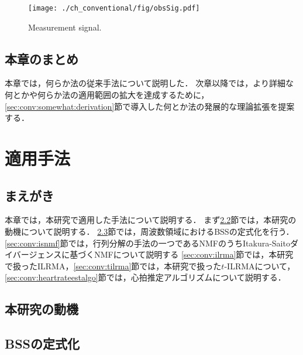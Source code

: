 \begin{figure}[tb]
\centering
\texttt{[image: ./ch\_conventional/fig/obsSig.pdf]}
\caption{Measurement signal.}
\label{fig:obssig}
\end{figure}

\section{本章のまとめ}
本章では，何らか法の従来手法について説明した．
次章以降では，より詳細な何とかや何らか法の適用範囲の拡大を達成するために，
\ref{sec:conv:somewhat:derivation}節で導入した何とか法の発展的な理論拡張を提案する．


\chapter{適用手法}
\label{chap:methods}

\section{まえがき}
本章では，本研究で適用した手法について説明する．
まず\ref{sec:conv:researchmotivation}節では，本研究の動機について説明する．
\ref{sec:conv:bssformularization}節では，周波数領域におけるBSSの定式化を行う．
\ref{sec:conv:isnmf}節では，行列分解の手法の一つであるNMFのうちItakura-Saitoダイバージェンスに基づくNMFについて説明する
\ref{sec:conv:ilrma}節では，本研究で扱ったILRMA，\ref{sec:conv:tilrma}節では，本研究で扱った$t$-ILRMAについて，\ref{sec:conv:heartrateestalgo}節では，心拍推定アルゴリズムについて説明する．

\section{本研究の動機}
\label{sec:conv:researchmotivation}

\section{BSSの定式化}
\label{sec:conv:bssformularization}

